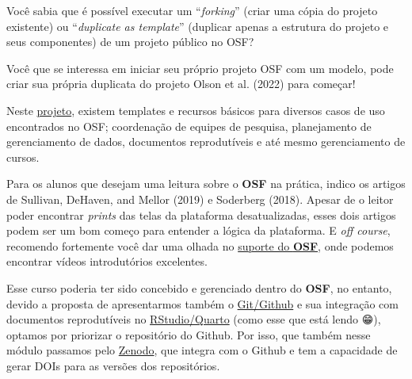 \documentclass[
  a4paper,
]{article}
\begin{document}
\begin{tcolorbox}[enhanced jigsaw, leftrule=.75mm, left=2mm, toprule=.15mm, opacitybacktitle=0.6, colback=white, titlerule=0mm, colbacktitle=quarto-callout-tip-color!10!white, bottomtitle=1mm, bottomrule=.15mm, opacityback=0, rightrule=.15mm, toptitle=1mm, title=\textcolor{quarto-callout-tip-color}{\faLightbulb}\hspace{0.5em}{Bifurcando ou duplicando um projeto}, colframe=quarto-callout-tip-color-frame, arc=.35mm, breakable, coltitle=black]

Você sabia que é possível executar um ``\emph{forking}'' (criar uma
cópia do projeto existente) ou ``\emph{duplicate as template}''
(duplicar apenas a estrutura do projeto e seus componentes) de um
projeto público no OSF?

Você que se interessa em iniciar seu próprio projeto OSF com um modelo,
pode criar sua própria duplicata do projeto Olson et al. (2022) para
começar!

Neste \href{https://osf.io/yaqe8/}{projeto}, existem templates e
recursos básicos para diversos casos de uso encontrados no OSF;
coordenação de equipes de pesquisa, planejamento de gerenciamento de
dados, documentos reprodutíveis e até mesmo gerenciamento de cursos.

\end{tcolorbox}

Para os alunos que desejam uma leitura sobre o \textbf{OSF} na prática,
indico os artigos de Sullivan, DeHaven, and Mellor (2019) e Soderberg
(2018). Apesar de o leitor poder encontrar \emph{prints} das telas da
plataforma desatualizadas, esses dois artigos podem ser um bom começo
para entender a lógica da plataforma. E \emph{off course}, recomendo
fortemente você dar uma olhada no
\href{https://help.osf.io/article/342-getting-started-on-the-osf}{suporte
do \textbf{OSF}}, onde podemos encontrar vídeos introdutórios
excelentes.

Esse curso poderia ter sido concebido e gerenciado dentro do
\textbf{OSF}, no entanto, devido a proposta de apresentarmos também o
\href{https://phdpablo.github.io/curso-open-science/05-git.html}{Git/Github}
e sua integração com documentos reprodutíveis no
\href{https://phdpablo.github.io/curso-open-science/06-quarto.html}{RStudio/Quarto}
(como esse que está lendo 😁), optamos por priorizar o repositório do
Github. Por isso, que também nesse módulo passamos pelo
\href{https://phdpablo.github.io/curso-open-science/00-prework.html\#sec-zenodoprework}{Zenodo},
que integra com o Github e tem a capacidade de gerar DOIs para as
versões dos repositórios.
\end{document}
